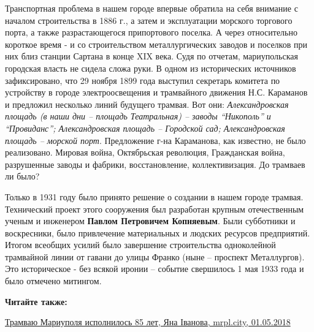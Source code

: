 Транспортная проблема в нашем городе впервые обратила на себя внимание с
началом строительства в 1886 г., а затем и эксплуатации морского торгового
порта, а также разрастающегося припортового поселка. А через относительно
короткое время - и со строительством металлургических заводов и поселков при
них близ станции Сартана в конце XIX века. Судя по отчетам, мариупольская
городская власть не сидела сложа руки. В одном из исторических источников
зафиксировано, что 29 ноября 1899 года выступил секретарь комитета по
устройству в городе электроосвещения и трамвайного движения Н.С. Караманов и
предложил несколько линий будущего трамвая. Вот они: \emph{Александровская площадь (в
наши дни – площадь Театральная) – заводы \enquote{Никополь} и
\enquote{Провиданс}; Александровская площадь – Городской сад; Александровская
площадь – морской порт}. Предложение г-на Караманова, как известно, не было
реализовано. Мировая война, Октябрьская революция, Гражданская война,
разрушенные заводы и фабрики, восстановление, коллективизация. До трамваев ли
было?

Только в 1931 году было принято решение о создании в нашем городе трамвая.
Технический проект этого сооружения был разработан крупным отечественным ученым
и инженером \textbf{Павлом Петровичем Копняевым}. Были субботники и воскресники, было
привлечение материальных и людских ресурсов предприятий. Итогом всеобщих усилий
было завершение строительства одноколейной трамвайной линии от гавани до улицы
Франко (ныне – проспект Металлургов). Это историческое - без всякой иронии –
событие свершилось 1 мая 1933 года и было отмечено митингом. 

\textbf{Читайте также:} 


\href{https://archive.org/details/01_05_2018.jana_ivanova.mrpl_city.tramvaju_mariupolja_ispolnilos_85_let}{%
Трамваю Мариуполя исполнилось 85 лет, Яна Іванова, mrpl.city, 01.05.2018}

